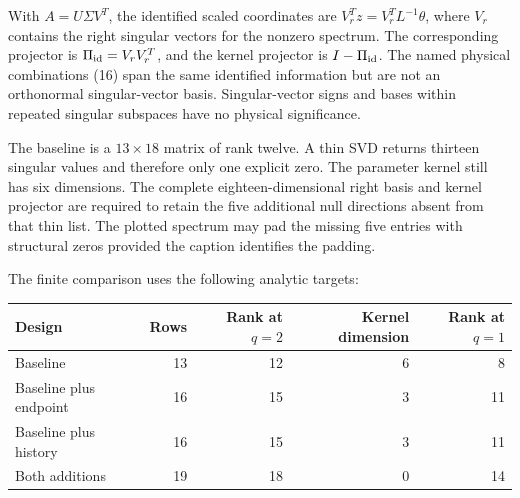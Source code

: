 \documentclass[aps,prd,preprint,onecolumn,notitlepage]{revtex4-2}
\begin{document}
With \(A=U\Sigma V^T\), the identified scaled coordinates are \(V_r^Tz=V_r^TL^{-1}\theta\), where \(V_r\) contains the right singular vectors for the nonzero spectrum. The corresponding projector is \(\Pi_{\rm id}=V_rV_r^T\), and the kernel projector is \(I-\Pi_{\rm id}\). The named physical combinations (16) span the same identified information but are not an orthonormal singular-vector basis. Singular-vector signs and bases within repeated singular subspaces have no physical significance.

The baseline is a \(13\times18\) matrix of rank twelve. A thin SVD returns thirteen singular values and therefore only one explicit zero. The parameter kernel still has six dimensions. The complete eighteen-dimensional right basis and kernel projector are required to retain the five additional null directions absent from that thin list. The plotted spectrum may pad the missing five entries with structural zeros provided the caption identifies the padding.

The finite comparison uses the following analytic targets:

\begin{longtable}[]{@{}lrrrr@{}}
\toprule\noalign{}
Design & Rows & Rank at \(q=2\) & Kernel dimension & Rank at \(q=1\) \\
\midrule\noalign{}
\endhead
\bottomrule\noalign{}
\endlastfoot
Baseline & 13 & 12 & 6 & 8 \\
Baseline plus endpoint & 16 & 15 & 3 & 11 \\
Baseline plus history & 16 & 15 & 3 & 11 \\
Both additions & 19 & 18 & 0 & 14 \\
\end{longtable}
\end{document}
